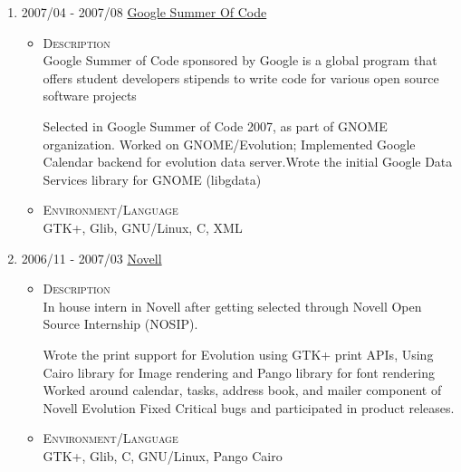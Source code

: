\documentclass[a4paper,10pt]{article}
\begin{document}
\begin{enumerate}
\begin{itemize}
   \end{itemize}

\item \textsc{2007/04} - \textsc{2007/08} \href{https://developers.google.com/open-source/gsoc/2007/}{Google Summer Of Code} \\
  \begin {itemize}
  \item \textsc{Description} \\
  Google Summer of Code sponsored by Google is a global program that offers student
  developers stipends to write code for various open source software projects

  Selected in Google Summer of Code 2007, as part of GNOME organization.
  Worked on GNOME/Evolution; Implemented Google Calendar backend for evolution data server.Wrote the initial Google Data Services library for GNOME (libgdata)

\item \textsc{Environment/Language} \\
  GTK+, Glib, GNU/Linux, C, XML  
  \end {itemize}

\item \textsc{2006/11 - 2007/03} \href{www.novell.com}{Novell} \\
  \begin {itemize}
  \item \textsc{Description} \\
  
  In house intern in Novell after getting selected through Novell Open Source Internship (NOSIP).
 
  Wrote the print support for Evolution using GTK+ print APIs, Using Cairo library for Image rendering and Pango library for font rendering
  Worked around calendar, tasks, address book, and mailer component of Novell Evolution
  Fixed Critical bugs and participated in product releases.
\item \textsc{Environment/Language} \\
  GTK+, Glib, C, GNU/Linux, Pango Cairo
  \end {itemize}
\end{enumerate}

\end{document}
